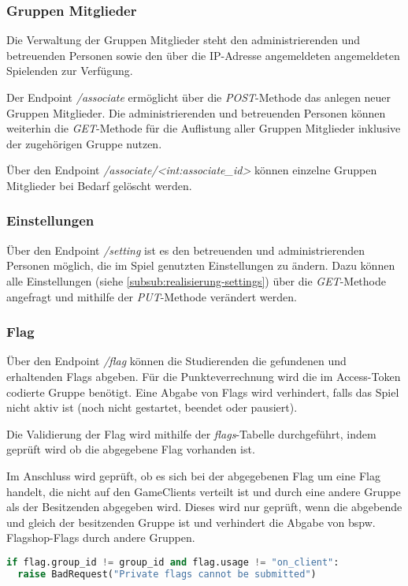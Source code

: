\subsubsection{Gruppen Mitglieder}
Die Verwaltung der Gruppen Mitglieder steht den administrierenden und betreuenden Personen sowie den über die IP-Adresse angemeldeten angemeldeten Spielenden zur Verfügung.

Der Endpoint \textit{/associate} ermöglicht über die \textit{POST}-Methode das anlegen neuer Gruppen Mitglieder. Die administrierenden und betreuenden Personen können weiterhin die \textit{GET}-Methode für die Auflistung aller Gruppen Mitglieder inklusive der zugehörigen Gruppe nutzen.

Über den Endpoint \textit{/associate/<int:associate\_id>} können einzelne Gruppen Mitglieder bei Bedarf gelöscht werden.

\subsubsection{Einstellungen}
Über den Endpoint \textit{/setting} ist es den betreuenden und administrierenden Personen möglich, die im Spiel genutzten Einstellungen zu ändern. Dazu können alle Einstellungen (siehe \autoref{subsub:realisierung-settings}) über die \textit{GET}-Methode angefragt und mithilfe der \textit{PUT}-Methode verändert werden.

\subsubsection{Flag}
Über den Endpoint \textit{/flag} können die Studierenden die gefundenen und erhaltenden Flags abgeben. Für die Punkteverrechnung wird die im Access-Token codierte Gruppe benötigt. Eine Abgabe von Flags wird verhindert, falls das Spiel nicht aktiv ist (noch nicht gestartet, beendet oder pausiert).

Die Validierung der Flag wird mithilfe der \textit{flags}-Tabelle durchgeführt, indem geprüft wird ob die abgegebene Flag vorhanden ist.

Im Anschluss wird geprüft, ob es sich bei der abgegebenen Flag um eine Flag handelt, die nicht auf den GameClients verteilt ist und durch eine andere Gruppe als der Besitzenden abgegeben wird. Dieses wird nur geprüft, wenn die abgebende und gleich der besitzenden Gruppe ist und verhindert die Abgabe von bspw. Flagshop-Flags durch andere Gruppen. 

\begin{lstlisting}[language=Python, frame=single, caption={GIS Abgabe privater Flags verhindern}, captionpos=b, label={lst:gis-prevent-submitting-private-flags}]
if flag.group_id != group_id and flag.usage != "on_client":
  raise BadRequest("Private flags cannot be submitted")
\end{lstlisting}

